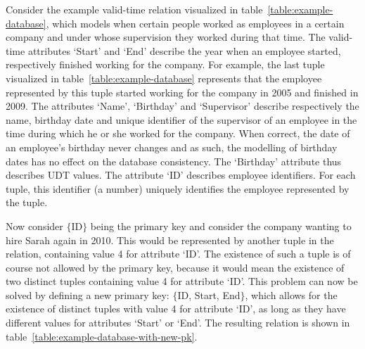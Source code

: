 \begin{example}
\label{ex:pk}
Consider the example valid-time relation visualized in table~\ref{table:example-database}, which models when certain people worked as employees in a certain company and under whose supervision they worked during that time. The valid-time attributes `Start' and `End' describe the year when an employee started, respectively finished working for the company. For example, the last tuple visualized in table~\ref{table:example-database} represents that the employee represented by this tuple started working for the company in 2005 and finished in 2009. The attributes `Name', `Birthday' and `Supervisor' describe respectively the name, birthday date and unique identifier of the supervisor of an employee in the time during which he or she worked for the company. When correct, the date of an employee's birthday never changes and as such, the modelling of birthday dates has no effect on the database consistency. The `Birthday' attribute thus describes UDT values. The attribute `ID' describes employee identifiers. For each tuple, this identifier (a number) uniquely identifies the employee represented by the tuple. 

Now consider $\{$ID$\}$ being the primary key and consider the company wanting to hire Sarah again in 2010. This would be represented by another tuple in the relation, containing value 4 for attribute `ID'. The existence of such a tuple is of course not allowed by the primary key, because it would mean the existence of two distinct tuples containing value 4 for attribute `ID'. This problem can now be solved by defining a new primary key: $\{$ID, Start, End$\}$, which allows for the existence of distinct tuples with value 4 for attribute `ID', as long as they have different values for attributes `Start' or `End'. The resulting relation is shown in table~\ref{table:example-database-with-new-pk}.

\end{example}
